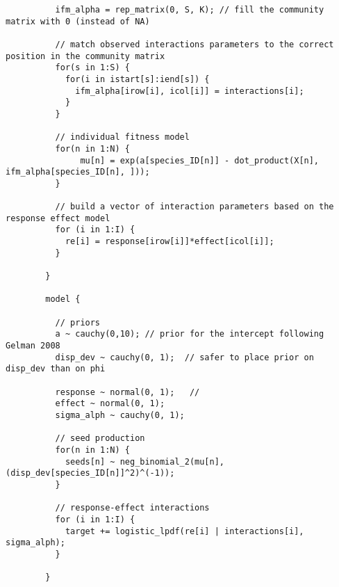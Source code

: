 \documentclass[a4,12pt]{article}
\begin{document}
\begin{adjustwidth}{-150pt}{}
\begin{lstlisting}
          ifm_alpha = rep_matrix(0, S, K); // fill the community matrix with 0 (instead of NA)
          
          // match observed interactions parameters to the correct position in the community matrix
          for(s in 1:S) {
            for(i in istart[s]:iend[s]) {
              ifm_alpha[irow[i], icol[i]] = interactions[i];
            }
          }
          
          // individual fitness model 
          for(n in 1:N) {
               mu[n] = exp(a[species_ID[n]] - dot_product(X[n], ifm_alpha[species_ID[n], ]));  
          }
          
          // build a vector of interaction parameters based on the response effect model 
          for (i in 1:I) {
            re[i] = response[irow[i]]*effect[icol[i]];
          }
          
        } 

        model {

          // priors
          a ~ cauchy(0,10); // prior for the intercept following Gelman 2008
          disp_dev ~ cauchy(0, 1);  // safer to place prior on disp_dev than on phi
          
          response ~ normal(0, 1);   // 
          effect ~ normal(0, 1);
          sigma_alph ~ cauchy(0, 1);

          // seed production 
          for(n in 1:N) {
            seeds[n] ~ neg_binomial_2(mu[n], (disp_dev[species_ID[n]]^2)^(-1));
          }

          // response-effect interactions
          for (i in 1:I) {
            target += logistic_lpdf(re[i] | interactions[i], sigma_alph);
          }
          
        }
    \end{lstlisting}

\end{adjustwidth}
\end{document}
